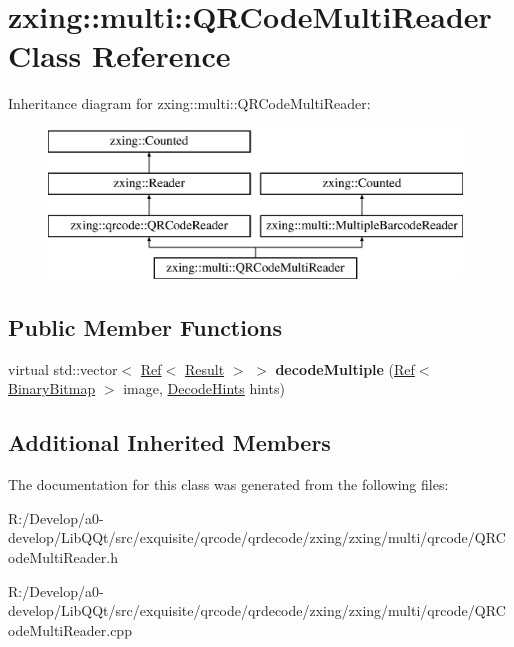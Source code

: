 \hypertarget{classzxing_1_1multi_1_1_q_r_code_multi_reader}{}\section{zxing\+:\+:multi\+:\+:Q\+R\+Code\+Multi\+Reader Class Reference}
\label{classzxing_1_1multi_1_1_q_r_code_multi_reader}
Inheritance diagram for zxing\+:\+:multi\+:\+:Q\+R\+Code\+Multi\+Reader\+:\begin{figure}[H]
\begin{center}
\leavevmode
\includegraphics[height=4.000000cm]{classzxing_1_1multi_1_1_q_r_code_multi_reader}
\end{center}
\end{figure}
\subsection*{Public Member Functions}
\begin{DoxyCompactItemize}
\item 
\mbox{\label{classzxing_1_1multi_1_1_q_r_code_multi_reader_afa9885194c51a421d05e761ff0667d80}} 
virtual std\+::vector$<$ \mbox{\hyperlink{classzxing_1_1_ref}{Ref}}$<$ \mbox{\hyperlink{classzxing_1_1_result}{Result}} $>$ $>$ {\bfseries decode\+Multiple} (\mbox{\hyperlink{classzxing_1_1_ref}{Ref}}$<$ \mbox{\hyperlink{classzxing_1_1_binary_bitmap}{Binary\+Bitmap}} $>$ image, \mbox{\hyperlink{classzxing_1_1_decode_hints}{Decode\+Hints}} hints)
\end{DoxyCompactItemize}
\subsection*{Additional Inherited Members}


The documentation for this class was generated from the following files\+:\begin{DoxyCompactItemize}
\item 
R\+:/\+Develop/a0-\/develop/\+Lib\+Q\+Qt/src/exquisite/qrcode/qrdecode/zxing/zxing/multi/qrcode/Q\+R\+Code\+Multi\+Reader.\+h\item 
R\+:/\+Develop/a0-\/develop/\+Lib\+Q\+Qt/src/exquisite/qrcode/qrdecode/zxing/zxing/multi/qrcode/Q\+R\+Code\+Multi\+Reader.\+cpp\end{DoxyCompactItemize}

